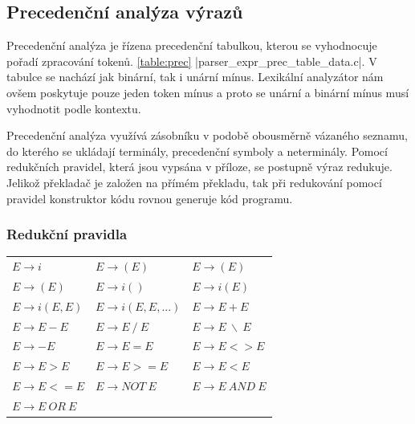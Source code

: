 \subsection{Precedenční analýza výrazů}
Precedenční analýza je řízena precedenční tabulkou, kterou se vyhodnocuje pořadí zpracování tokenů. \ref{table:prec}
\ic|parser_expr_prec_table_data.c|. V tabulce se nachází jak binární, tak i unární mínus.
Lexikální analyzátor nám ovšem poskytuje pouze jeden token mínus a proto se unární a binární mínus
musí vyhodnotit podle kontextu.

Precedenční analýza využívá zásobníku v podobě obousměrně vázaného seznamu, do kterého se ukládají terminály,
precedenční symboly a neterminály. Pomocí redukčních pravidel, která jsou vypsána v příloze, se postupně výraz redukuje.
Jelikož překladač je založen na přímém překladu, tak při redukování pomocí pravidel konstruktor kódu rovnou generuje kód programu.

\subsubsection{Redukční pravidla}


\begin{table}[htbp]
    \centering
    \label{Redukční pravidla}
    \begin{tabular}{lll}
        $E \to i$ &  $E \to (E)$ & $E \to (E)$ \\
        $E \to (E)$ & $E \to i()$ & $E \to i(E)$\\
        $E \to i(E, E)$ & $E \to i(E, E, ...)$ &  $E \to E + E$\\
        $E \to E - E$ & $E \to E ~ / ~ E$ & $E \to E ~ \backslash ~ E$\\
        $E \to - E$ &  $E \to E = E$ & $E \to E <> E$\\
        $E \to E > E$ & $E \to E >= E$ & $E \to E < E$\\
        $E \to E <= E$ & $E \to NOT ~ E$ & $E \to E ~ AND ~ E$\\
        $E \to E ~ OR ~ E$ & & \\
    \end{tabular}
\end{table}


